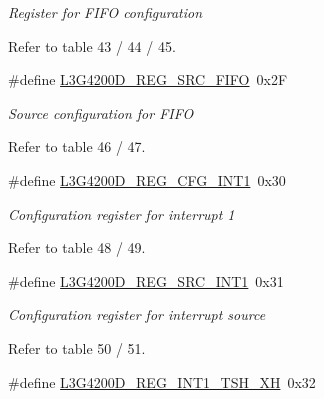 \begin{DoxyCompactItemize}
\begin{DoxyCompactList}\small\item\em \-Register for \-F\-I\-F\-O configuration\par
 \-Refer to table 43 / 44 / 45. \end{DoxyCompactList}\item 
\hypertarget{group___l3_g4200_d___r_e_g_i_s_t_e_r_s_ga52a365fe7f5db010d374c9d806270095}{\#define \hyperlink{group___l3_g4200_d___r_e_g_i_s_t_e_r_s_ga52a365fe7f5db010d374c9d806270095}{\-L3\-G4200\-D\-\_\-\-R\-E\-G\-\_\-\-S\-R\-C\-\_\-\-F\-I\-F\-O}~0x2\-F}\label{group___l3_g4200_d___r_e_g_i_s_t_e_r_s_ga52a365fe7f5db010d374c9d806270095}

\begin{DoxyCompactList}\small\item\em \-Source configuration for \-F\-I\-F\-O\par
 \-Refer to table 46 / 47. \end{DoxyCompactList}\item 
\hypertarget{group___l3_g4200_d___r_e_g_i_s_t_e_r_s_gabe7303d9e7b2f4964056fcaaef5ed9d4}{\#define \hyperlink{group___l3_g4200_d___r_e_g_i_s_t_e_r_s_gabe7303d9e7b2f4964056fcaaef5ed9d4}{\-L3\-G4200\-D\-\_\-\-R\-E\-G\-\_\-\-C\-F\-G\-\_\-\-I\-N\-T1}~0x30}\label{group___l3_g4200_d___r_e_g_i_s_t_e_r_s_gabe7303d9e7b2f4964056fcaaef5ed9d4}

\begin{DoxyCompactList}\small\item\em \-Configuration register for interrupt 1\par
 \-Refer to table 48 / 49. \end{DoxyCompactList}\item 
\hypertarget{group___l3_g4200_d___r_e_g_i_s_t_e_r_s_ga29b065479947b9a4a7527b7ac0b5cdf2}{\#define \hyperlink{group___l3_g4200_d___r_e_g_i_s_t_e_r_s_ga29b065479947b9a4a7527b7ac0b5cdf2}{\-L3\-G4200\-D\-\_\-\-R\-E\-G\-\_\-\-S\-R\-C\-\_\-\-I\-N\-T1}~0x31}\label{group___l3_g4200_d___r_e_g_i_s_t_e_r_s_ga29b065479947b9a4a7527b7ac0b5cdf2}

\begin{DoxyCompactList}\small\item\em \-Configuration register for interrupt source\par
 \-Refer to table 50 / 51. \end{DoxyCompactList}\item 
\hypertarget{group___l3_g4200_d___r_e_g_i_s_t_e_r_s_ga1185af16387f1a9e8624273b03e17ede}{\#define \hyperlink{group___l3_g4200_d___r_e_g_i_s_t_e_r_s_ga1185af16387f1a9e8624273b03e17ede}{\-L3\-G4200\-D\-\_\-\-R\-E\-G\-\_\-\-I\-N\-T1\-\_\-\-T\-S\-H\-\_\-\-X\-H}~0x32}\label{group___l3_g4200_d___r_e_g_i_s_t_e_r_s_ga1185af16387f1a9e8624273b03e17ede}


\end{DoxyCompactItemize}
